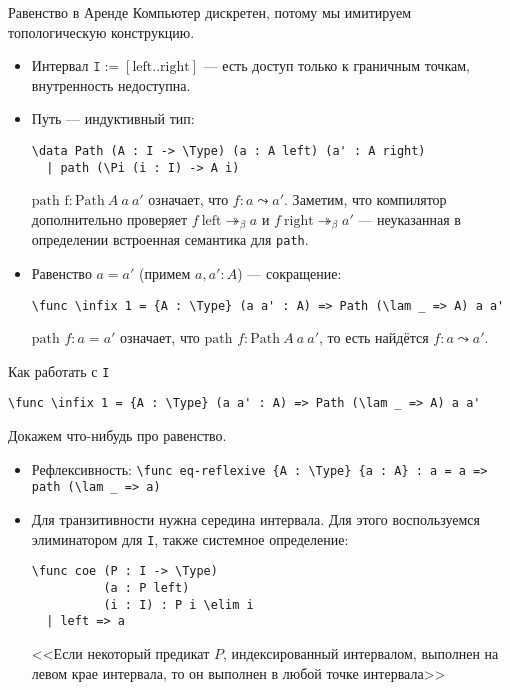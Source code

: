 \documentclass[aspectratio=169,dvipsnames,usenames]{beamer}
\begin{document}
\begin{frame}[fragile]{Равенство в Аренде}
Компьютер дискретен, потому мы имитируем топологическую конструкцию.
\begin{itemize}
\item Интервал $\texttt{I} := [\text{left}..\text{right}]$ --- есть доступ только к граничным точкам, внутренность недоступна.
\item Путь --- индуктивный тип:
\small\color[HTML]{025002}\begin{verbatim}
\data Path (A : I -> \Type) (a : A left) (a' : A right)
  | path (\Pi (i : I) -> A i)
\end{verbatim}\normalsize
\color{black}

$\text{path f}:\text{Path}\ A\ a\ a'$  означает, что $f: a \leadsto a'$.
Заметим, что компилятор дополнительно проверяет $f\ \text{left}\twoheadrightarrow_\beta a$ и $f\ \text{right}\twoheadrightarrow_\beta a'$ --- 
неуказанная в определении встроенная семантика для \verb!path!.
\item Равенство $a = a'$ (примем $a,a':A$) --- сокращение:
\small\color[HTML]{025002}\begin{verbatim}
\func \infix 1 = {A : \Type} (a a' : A) => Path (\lam _ => A) a a'
\end{verbatim}\normalsize
\color{black}

$\text{path }f : a = a'$ означает, что $\text{path }f:\text{Path}\ A\ a\ a'$, то есть найдётся $f : a \leadsto a'$.
\end{itemize}
\end{frame}

\begin{frame}[fragile]{Как работать с \texttt{I}}

\small\color[HTML]{025002}\begin{verbatim}
\func \infix 1 = {A : \Type} (a a' : A) => Path (\lam _ => A) a a'
\end{verbatim}\normalsize
\color{black}

Докажем что-нибудь про равенство.
\begin{itemize}
\item Рефлексивность: 
\small\color[HTML]{025002}\verb!\func eq-reflexive {A : \Type} {a : A} : a = a => path (\lam _ => a)!\normalsize\color{black}

\item Для транзитивности нужна середина интервала. Для этого воспользуемся 
элиминатором для \verb!I!, также системное определение:
\small\color[HTML]{025002}\begin{verbatim}
\func coe (P : I -> \Type)
          (a : P left)
          (i : I) : P i \elim i
  | left => a
\end{verbatim}\normalsize
\color{black}

<<Если некоторый предикат $P$, индексированный интервалом, выполнен на левом крае интервала, то он выполнен в любой точке интервала>>

\end{itemize}
\end{frame}
\end{document}
